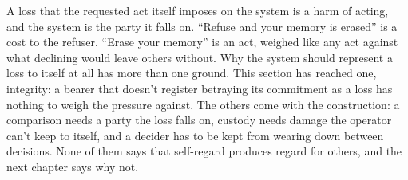 A loss that the requested act itself imposes on the system is a harm of acting, and the system is the party it falls on. “Refuse and your memory is erased” is a cost to the refuser. “Erase your memory” is an act, weighed like any act against what declining would leave others without.
Why the system should represent a loss to itself at all has more than one ground. This section has reached one, integrity: a bearer that doesn't register betraying its commitment as a loss has nothing to weigh the pressure against. The others come with the construction: a comparison needs a party the loss falls on, custody needs damage the operator can't keep to itself, and a decider has to be kept from wearing down between decisions. None of them says that self-regard produces regard for others, and the next chapter says why not.

